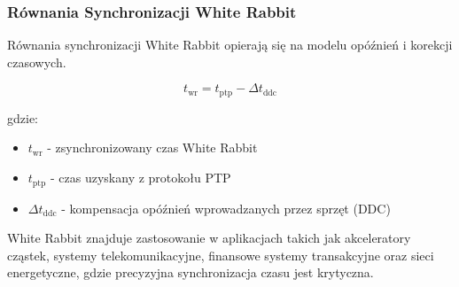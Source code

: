 \subsubsection{Równania Synchronizacji White Rabbit}
Równania synchronizacji White Rabbit opierają się na modelu opóźnień i korekcji czasowych.

\[
t_{\text{wr}} = t_{\text{ptp}} - \Delta t_{\text{ddc}}
\]

gdzie:
\begin{itemize}
    \item \( t_{\text{wr}} \) - zsynchronizowany czas White Rabbit
    \item \( t_{\text{ptp}} \) - czas uzyskany z protokołu PTP
    \item \( \Delta t_{\text{ddc}} \) - kompensacja opóźnień wprowadzanych przez sprzęt (DDC)
\end{itemize}

White Rabbit znajduje zastosowanie w aplikacjach takich jak akceleratory cząstek, systemy telekomunikacyjne, finansowe systemy transakcyjne oraz sieci energetyczne, gdzie precyzyjna synchronizacja czasu jest krytyczna.
